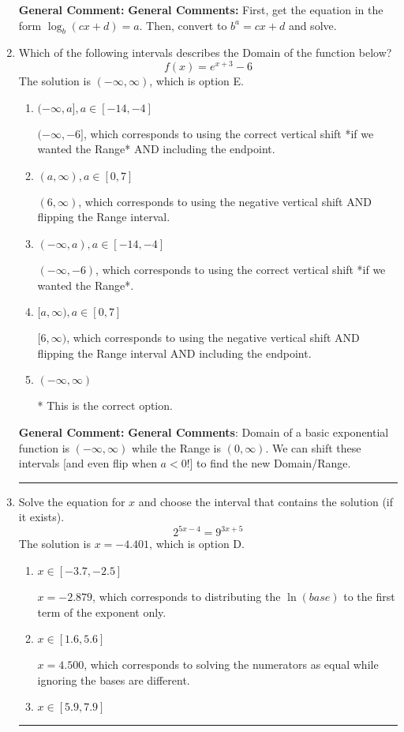 \documentclass{extbook}[14pt]
\newcommand{\litem}[1]{\item #1

\rule{\textwidth}{0.4pt}}
\begin{document}
\begin{enumerate}
{\textbf{General Comment:} \textbf{General Comments:} First, get the equation in the form $\log_b{(cx+d)} = a$. Then, convert to $b^a = cx+d$ and solve.
}
\litem{
Which of the following intervals describes the Domain of the function below?
\[ f(x) = e^{x+3}-6 \]
The solution is \( (-\infty, \infty) \), which is option E.\begin{enumerate}[label=\Alph*.]
\item \( (-\infty, a], a \in [-14, -4] \)

$(-\infty, -6]$, which corresponds to using the correct vertical shift *if we wanted the Range* AND including the endpoint.
\item \( (a, \infty), a \in [0, 7] \)

$(6, \infty)$, which corresponds to using the negative vertical shift AND flipping the Range interval.
\item \( (-\infty, a), a \in [-14, -4] \)

$(-\infty, -6)$, which corresponds to using the correct vertical shift *if we wanted the Range*.
\item \( [a, \infty), a \in [0, 7] \)

$[6, \infty)$, which corresponds to using the negative vertical shift AND flipping the Range interval AND including the endpoint.
\item \( (-\infty, \infty) \)

* This is the correct option.
\end{enumerate}

\textbf{General Comment:} \textbf{General Comments}: Domain of a basic exponential function is $(-\infty, \infty)$ while the Range is $(0, \infty)$. We can shift these intervals [and even flip when $a<0$!] to find the new Domain/Range.
}
\litem{
Solve the equation for $x$ and choose the interval that contains the solution (if it exists).
\[ 2^{5x-4} = 9^{3x+5} \]
The solution is \( x = -4.401 \), which is option D.\begin{enumerate}[label=\Alph*.]
\item \( x \in [-3.7, -2.5] \)

$x = -2.879$, which corresponds to distributing the $\ln(base)$ to the first term of the exponent only.
\item \( x \in [1.6, 5.6] \)

$x = 4.500$, which corresponds to solving the numerators as equal while ignoring the bases are different.
\item \( x \in [5.9, 7.9] \)


\end{enumerate}}
\end{enumerate}
\end{document}
